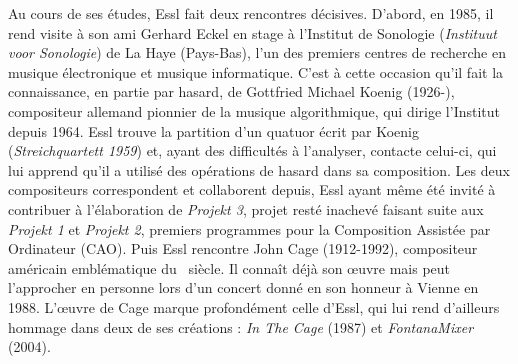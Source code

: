 \documentclass[a4paper,12pt]{article}
\begin{document}
Au cours de ses études, Essl fait deux rencontres décisives. D'abord, en 1985, il rend visite à son ami Gerhard Eckel en stage à l'Institut de Sonologie (\emph{Instituut voor Sonologie}) de La Haye (Pays-Bas), l'un des premiers centres de recherche en musique électronique et musique informatique. C'est à cette occasion qu'il fait la connaissance, en partie par hasard, de Gottfried Michael Koenig (1926-), compositeur allemand pionnier de la musique algorithmique, qui dirige l'Institut depuis 1964. Essl trouve la partition d'un quatuor écrit par Koenig (\emph{Streichquartett 1959}) et, ayant des difficultés à l'analyser, contacte celui-ci, qui lui apprend qu'il a utilisé des opérations de hasard dans sa composition. Les deux compositeurs correspondent et collaborent depuis, Essl ayant même été invité à contribuer à l'élaboration de \emph{Projekt 3}, projet resté inachevé faisant suite aux \emph{Projekt 1} et \emph{Projekt 2}, premiers programmes pour la Composition Assistée par Ordinateur (CAO). Puis Essl rencontre John Cage (1912-1992), compositeur américain emblématique du \XXe~siècle. Il connaît déjà son œuvre mais peut l'approcher en personne lors d'un concert donné en son honneur à Vienne en 1988. L'œuvre de Cage marque profondément celle d'Essl, qui lui rend d'ailleurs hommage dans deux de ses créations : \emph{In The Cage} (1987) et \emph{FontanaMixer} (2004).
\end{document}
